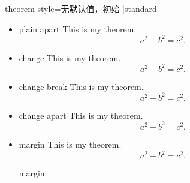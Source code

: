 \begin{docTcbKey}{theorem style}{=}{无默认值，初始 |standard|}
\begin{itemize}
\begin{dispExample}
\begin{theorem}[theorem style=break]{break}{}
\end{theorem}
\end{dispExample}
%
\item{}
\begin{dispExample}
\begin{theorem}[theorem style=plain apart]{plain apart}{}
This is my theorem. \begin{equation*} a^2 + b^2 = c^2. \end{equation*}
\end{theorem}
\end{dispExample}
%
\item{}
\begin{dispExample}
\begin{theorem}[theorem style=change]{change}{}
This is my theorem. \begin{equation*} a^2 + b^2 = c^2. \end{equation*}
\end{theorem}
\end{dispExample}
%
\item{}
\begin{dispExample}
\begin{theorem}[theorem style=change break]{change break}{}
This is my theorem. \begin{equation*} a^2 + b^2 = c^2. \end{equation*}
\end{theorem}
\end{dispExample}
%
\item{}
\begin{dispExample}
\begin{theorem}[theorem style=change apart]{change apart}{}
This is my theorem. \begin{equation*} a^2 + b^2 = c^2. \end{equation*}
\end{theorem}
\end{dispExample}
%
\clearpage
\item{}
\begin{dispExample}
\begin{theorem}[theorem style=margin,left=10mm]{margin}{}
This is my theorem. \begin{equation*} a^2 + b^2 = c^2. \end{equation*}
\end{theorem}
\begin{theorem}[theorem style=margin,left=10mm,oversize]{margin}{}

\end{theorem}
\end{dispExample}
\end{itemize}
\end{docTcbKey}
